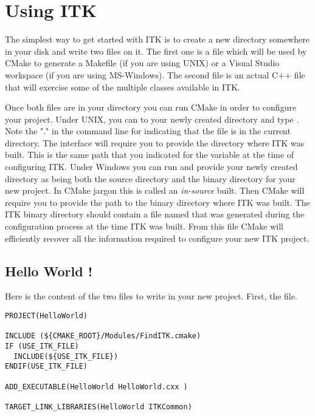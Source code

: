 \section{Using ITK }
\label{sec:UsingITK}
 
The simplest way to get started with ITK is to create a new directory
somewhere in your disk and write two files on it. The first one is a
 file which will be used by CMake to generate a Makefile
(if you are using UNIX) or a Visual Studio workspace (if you are using
MS-Windows).  The second file is an actual C++ file that will exercise some of
the multiple classes available in ITK.

Once both files are in your directory you can run CMake in order to configure
your project. Under UNIX, you can  to your newly created directory
and type . Note the "." in the command line for indicating
that the  file is in the current directory. The
 interface will require you to provide the directory where ITK
was built. This is the same path that you indicated for the
 variable at the time of configuring ITK. Under
Windows you can run  and provide your newly created
directory as being both the source directory and the binary directory for
your new project. In CMake jargon this is called an
\emph{in-source} built. Then CMake will require you to provide the path to the
binary directory where ITK was built. The ITK binary directory should contain a
file named  that was generated during the configuration
process at the time ITK was built.  From this file CMake will efficiently
recover all the information required to configure your new ITK project.  

\subsection{Hello World !}
\label{sec:HelloWorldITK}


Here is the content of the two files to write in your new project. First, the
 file.

\begin{verbatim}
PROJECT(HelloWorld)

INCLUDE (${CMAKE_ROOT}/Modules/FindITK.cmake)
IF (USE_ITK_FILE)
  INCLUDE(${USE_ITK_FILE})
ENDIF(USE_ITK_FILE)

ADD_EXECUTABLE(HelloWorld HelloWorld.cxx )

TARGET_LINK_LIBRARIES(HelloWorld ITKCommon)
\end{verbatim}

